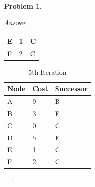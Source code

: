 \documentclass[11pt]{article}
\theoremstyle{definition}
\theoremstyle{definition}
\newtheorem{required}{Problem}
\theoremstyle{definition}
\begin{document}
\begin{required}
\begin{proof}[Answer]
\begin{table}[htp]
\begin{tabular}{|l|l|l|}
\hline
E                                      & 1    & C          \\ 
\hline
F                                      & 2    & C          \\
\hline
\end{tabular}
\end{table}
\begin{table}
\centering
\caption{5th Iteration}
\begin{tabular}{|l|l|l|} 
\hline
\rowcolor[rgb]{0.753,0.753,0.753} Node & Cost & Successor  \\ 
\hline
A                                      & 9    & B          \\ 
\hline
B                                      & 3    & F          \\ 
\hline
C                                      & 0    & C          \\ 
\hline
D                                      & 5    & F          \\ 
\hline
E                                      & 1    & C          \\ 
\hline
F                                      & 2    & C          \\
\hline
\end{tabular}
\end{table}

\end{proof}


\end{required}
\end{document}
